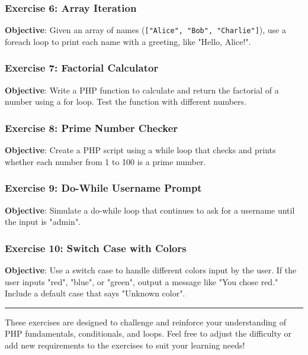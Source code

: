 \documentclass[11pt]{article}
\begin{document}
\subsubsection{Exercise 6: Array Iteration}
\label{sec:org1bd7c2e}
\textbf{Objective}: Given an array of names (\texttt{["Alice", "Bob", "Charlie"]}),
use a foreach loop to print each name with a greeting, like "Hello,
Alice!".

\subsubsection{Exercise 7: Factorial Calculator}
\label{sec:org5136aa4}
\textbf{Objective}: Write a PHP function to calculate and return the factorial
of a number using a for loop. Test the function with different numbers.

\subsubsection{Exercise 8: Prime Number Checker}
\label{sec:orga6de3c7}
\textbf{Objective}: Create a PHP script using a while loop that checks and
prints whether each number from 1 to 100 is a prime number.

\subsubsection{Exercise 9: Do-While Username Prompt}
\label{sec:org3e30a1e}
\textbf{Objective}: Simulate a do-while loop that continues to ask for a
username until the input is "admin".

\subsubsection{Exercise 10: Switch Case with Colors}
\label{sec:orge242a1e}
\textbf{Objective}: Use a switch case to handle different colors input by the
user. If the user inputs "red", "blue", or "green", output a message
like "You chose red." Include a default case that says "Unknown color".

\noindent\rule{\textwidth}{0.5pt}

These exercises are designed to challenge and reinforce your
understanding of PHP fundamentals, conditionals, and loops. Feel free to
adjust the difficulty or add new requirements to the exercises to suit
your learning needs!
\end{document}
